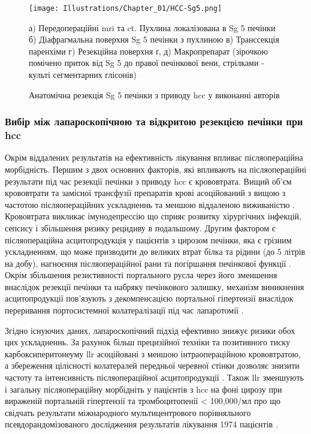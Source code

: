 \begin{refsection}
\begin{figure}[htbp]
\caption{Анатомічна резекція Sg 5 печінки з приводу \acrshort{hcc} у виконанні авторів}

\texttt{[image: Illustrations/Chapter\_01/HCC-Sg5.png]}
\label{fig:HCC-Sg5}

\medskip
\small
а) Передопераційні \acrshort{mri} та \acrshort{ct}. Пухлина локалізована в Sg 5 печінки б) Діафрагмальна поверхня Sg 5 печінки з пухлиною  в) Транссекція паренхіми г) Резекційна поверхня ґ, д) Макропрепарат (зірочкою помічено приток від Sg 5 до правої печінкової вени, стрілками - культі сегментарних глісонів)

\end{figure}



\subsubsection{Вибір між лапароскопічною та відкритою резекцією печінки при \acrshort{hcc}} 
Окрім віддалених результатів на ефективність лікування впливає післяопераційна морбідність. Першим з двох основних факторів, які впливають на післяопераційні результати під час резекції печінки з приводу \acrshort{hcc} є крововтрата. Вищий об'єм крововтрати та замісної трансфузії препаратів крові асоційований з вищою з частотою післяопераційних ускладненнь та меншою віддаленою виживаністю \cite{DeBoer2007, Romano2012}. Крововтрата викликає імунодепрессію що сприяє розвитку хірургічних інфекцій, сепсису і збільшення ризику рецидиву в подальшому. Другим фактором є післяопераційна асцитопродукція у пацієнтів з цирозом печінки, яка є грізним ускладненням, що може призводити до великих втрат білка та рідини (до 5 літрів на добу), нагноєння післяопераційної рани та погіршання печінкової функції \cite{Ishii2014}. Окрім збільшення резистивності портального русла через його зменшення внаслідок резекції печінки та набряку печінкового залишку, механізм виникнення асцитопродукції пов'язують з декомпенсацією портальної гіпертензії внаслідок переривання портосистемної колатералізації під час лапаротомії \cite{Kanazawa2013}. 

Згідно існуючих даних, лапароскопічний підхід ефективно знижує ризики обох цих ускладненнь. За рахунок більш прецизійної техніки та позитивного тиску карбоксиперитонеуму \acrshort{llr} асоційовані з меншою інтраопераційною крововтратою, а збереження цілісності колатералей передньої черевної стінки дозволяє знизити частоту та інтенсивність післяопераційної асцитопродукції \cite{Truant2011}. Також \acrshort{llr} зменшують і загальну післяопераційну морбідніть у пацієнтів з \acrshort{hcc} на фоні цирозу при вираженій портальній гіпертензії та тромбоцитопенії < 100,000/мл про що свідчать результати міжнародного мультицентрового порівняльного псевдорандомізованого дослідження результатів лікування 1974 пацієнтів \cite{Ruzzenente2020}.


\end{refsection}
